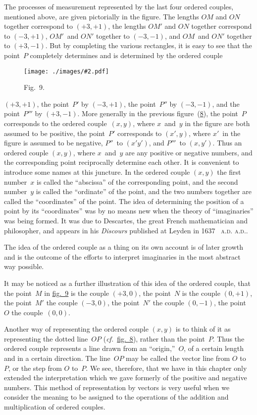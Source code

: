 \documentclass[12pt,leqno]{book}[2005/09/16]
\makeatletter
\newcommand{\Chg}[2]{#2}
\newcommand{\Graphic}[2]{%
  \phantomsection\label{fig:#2}%
  \texttt{[image: ./images/\#2.pdf]}%
}
\newcommand{\DefWidth}{4in}%
\newcommand{\Figure}[2][\DefWidth]{%
  \begin{figure}[hbt!]
    \centering
    \phantomsection\label{fig:#2}
    \Graphic{#1}{fig#2}
    \caption{Fig.~#2.}
  \end{figure}\ignorespaces%
}
\newcommand{\FigNum}[1]{\hyperref[fig:#1]{#1}}
\newcommand{\Fig}[2][Fig.]{\hyperref[fig:#2]{#1~#2}}
\newcommand{\PageSep}[1]{\ignorespaces}
\newcommand{\cf}{\emph{cf.}}
\newcommand{\Title}[1]{\textit{#1}}
\newcommand{\SCAbbrev}[3]{%
  \ifthenelse{\equal{#3}{.}}%
  {\textsc{\MakeLowercase{#1.#2}.}}%
  {\textsc{\MakeLowercase{#1.#2}.}\@#3}%
}
\newcommand{\AD}[1]{\SCAbbrev{A}{D}{#1}}
\makeatother
\begin{document}
The processes of measurement represented
by the last four ordered couples, mentioned
above, are given pictorially in the figure.
The lengths $OM$ and $ON$ together correspond
\PageSep{94}
to $(+3, +1)$, the lengths $OM'$ and $ON$
together correspond to $(-3, +1)$, $OM'$~and
$ON'$ together to $(-3, -1)$, and $OM$~and
$ON'$ together to $(+3, -1)$. But by completing
the various rectangles, it is easy to
see that the point~$P$ completely determines
and is determined by the ordered couple
\Figure{9}
$(+3, +1)$, the point~$P'$ by $(-3, +1)$, the
point~$P''$ by $(-3, -1)$, and the point~$P'''$ by
$(+3, -1)$. More generally in the previous
figure~(\FigNum{8}), the point~$P$ corresponds to the
ordered couple~$(x, y)$, where $x$~and~$y$ in the
figure are both assumed to be positive, the
point~$P'$ corresponds to $(x', y)$, where $x'$~in
the figure is assumed to be negative, $P''$~to
$(x' y')$, and $P'''$~to $(x, y')$. Thus an ordered
\PageSep{95}
couple $(x, y)$, where $x$~and~$y$ are any positive
or negative numbers, and the corresponding
point reciprocally determine each other. It
is convenient to introduce some names at this
juncture. In the ordered couple $(x, y)$ the
first number~$x$ is called the ``abscissa'' of the
%
corresponding point, and the second number~$y$
is called the ``ordinate'' of the point, and
%
the two numbers together are called the ``coordinates''
%
of the point. The idea of determining
the position of a point by its ``coordinates''
was by no means new when the
theory of ``imaginaries'' was being formed.
It was due to Descartes, the great French
%
mathematician and philosopher, and appears
in his \Title{Discours} published at Leyden in 1637~\AD.
The idea of the ordered couple as a
thing on its own account is of later growth
and is the outcome of the efforts to interpret
imaginaries in the most abstract way possible.

It may be noticed as a further illustration
of this idea of the ordered couple, that the
point~$M$ in \Fig[fig.]{9} is the couple $(+3, 0)$, the
point~$N$ is the couple $(0, +1)$, the point~$M'$
the couple $(-3, 0)$, the point~$N'$ the couple
$(0, -1)$, the point~$O$ the couple~$(0, 0)$.

Another way of representing the ordered
couple $(x, y)$ is to think of it as representing
the dotted line~$OP$ (\Chg{cf.}{\cf}\ \Fig[fig.]{8}), rather than the
point~$P$. Thus the ordered couple represents
a line drawn from an ``origin,''~$O$, of a certain
%
\PageSep{96}
%
length and in a certain direction. The line~$OP$
may be called the vector line from $O$ to~$P$,
or the step from $O$ to~$P$. We see, therefore,
that we have in this chapter only extended
the interpretation which we gave formerly of
the positive and negative numbers. This
method of representation by vectors is very
%
useful when we consider the meaning to be
assigned to the operations of the addition and
multiplication of ordered couples.
\end{document}
